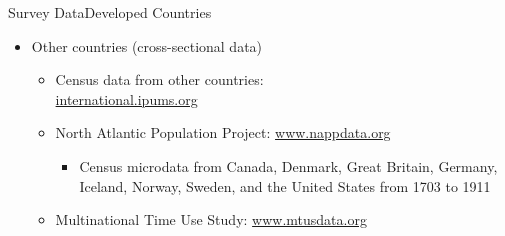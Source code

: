 \documentclass[hyperref={pdfpagelabels=false}]{beamer}
\begin{document}
\begin{frame}{Survey Data}{Developed Countries}
	\begin{itemize} 
		\item Other countries (cross-sectional data)
		\begin{itemize} 
			\vspace{0.3cm}
			\item Census data from other countries: \\ \href{https://international.ipums.org/international/}{international.ipums.org}
			\vspace{0.3cm}
			\item North Atlantic Population Project: \href{https://www.nappdata.org/napp/}{www.nappdata.org} 
			\vspace{0.3cm}
			\begin{itemize}
				\item Census microdata from Canada, Denmark, Great Britain, Germany, Iceland, Norway, Sweden, and the United States from 1703 to 1911
			\end{itemize}
			\vspace{0.3cm}
			\item Multinational Time Use Study: \href{https://www.mtusdata.org/mtus/}{www.mtusdata.org}  
		\end{itemize}
		
	\end{itemize}
\end{frame}
\end{document}

